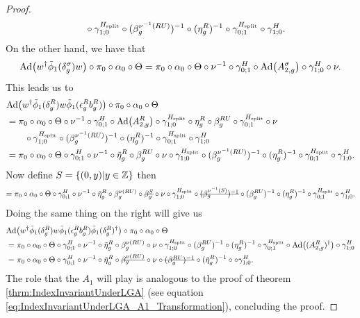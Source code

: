 \documentclass[11pt,a4paper,twoside]{article}
\numberwithin{equation}{section}
\begin{document}
\begin{proof}
\begin{align}
			\nonumber
			&\qquad \circ\gamma^{{H_{\text{split}}}}_{1;0}\circ(\beta_g^{\nu^{-1}(RU)})^{-1}\circ(\eta_g^R)^{-1}\circ\gamma^{{H_{\text{split}}}}_{0;1}\circ\gamma^{H}_{1;0}.
		\end{align}
		On the other hand, we have that
		\begin{equation}
			\Ad{w^\dagger \phiTilde_1(\delta_g^\sigma)w}\circ\pi_0\circ\alpha_0\circ\Theta=\pi_0\circ\alpha_0\circ\Theta\circ\nu^{-1}\circ\gamma^H_{0;1}\circ\Ad{A^\sigma_{2,g}}\circ\gamma^H_{1;0}\circ\nu.
		\end{equation}
		This leads us to
		\begin{align}
			&\Ad{w^\dagger\phiTilde_1(\delta_g^R)w\phiTilde_1(\epsilon_g^R b_g^R)}\circ\pi_0\circ\alpha_0\circ\Theta\\
			&=\pi_0\circ\alpha_0\circ\Theta\circ\nu^{-1}\circ\gamma^H_{0;1}\circ\Ad{A_{2,g}^R}\circ\gamma^{\Hsplit}_{1;0}\circ\eta_g^R\circ\beta_g^{RU}\circ\gamma^{\Hsplit}_{0;1}\circ\nu\\
			\nonumber
			&\qquad \circ\gamma^{\Hsplit}_{1;0}\circ(\beta_g^{\nu^{-1}(RU)})^{-1}\circ(\eta_g^R)^{-1}\circ\gamma^{\Hsplit}_{0;1}\circ\gamma^{H}_{1;0}\\
			&=\pi_0\circ\alpha_0\circ\Theta\circ\gamma^H_{0;1}\circ\nu^{-1}\circ\tilde\eta_g^R\circ\beta_g^{RU}\circ\nu\circ\gamma^{\Hsplit}_{1;0}\circ(\beta_g^{\nu^{-1}(RU)})^{-1}\circ(\eta_g^R)^{-1}\circ\gamma^{\Hsplit}_{0;1}\circ\gamma^{H}_{1;0}.
		\end{align}
		Now define $S=\{(0,y)|y\in\mathbb Z\}$ then
		\begin{equation}
			=\pi_0\circ\alpha_0\circ\Theta\circ\gamma^H_{0;1}\circ\nu^{-1}\circ\tilde\eta_g^R\circ\beta_g^{\nu(RU)}\circ\stkout{\beta_g^S}\circ\nu\circ\gamma^{\Hsplit}_{1;0}\circ\stkout{(\beta_g^{\nu^{-1}(S)})^{-1}}\circ(\beta_g^{RU})^{-1}\circ(\eta_g^R)^{-1}\circ\gamma^{\Hsplit}_{0;1}\circ\gamma^{H}_{1;0}.
		\end{equation}
		Doing the same thing on the right will give us
		\begin{align}
			&\Ad{w^\dagger\phiTilde_1(\delta_g^R)w\phiTilde_1(\epsilon_g^R b_g^R)\phiTilde_1(\delta_g^R)^\dagger}\circ\pi_0\circ\alpha_0\circ\Theta\\
			&=\pi_0\circ\alpha_0\circ\Theta\circ\gamma^H_{0;1}\circ\nu^{-1}\circ\tilde\eta_g^R\circ\beta_g^{\nu(RU)}\circ\nu\circ\gamma^{\Hsplit}_{1;0}\circ(\beta_g^{RU})^{-1}\circ(\eta_g^R)^{-1}\circ\gamma^{\Hsplit}_{0;1}\circ\Ad{(A_{2,g}^R)^\dagger}\circ\gamma^{H}_{1;0}\\
			&=\pi_0\circ\alpha_0\circ\Theta\circ\gamma^H_{0;1}\circ\nu^{-1}\circ\tilde\eta_g^R\circ\stkout{\beta_g^{\nu(RU)}}\circ\nu\circ\stkout{(\beta_g^{RU})^{-1}}\circ(\tilde\eta_g^R)^{-1}\circ\circ\gamma^{H}_{1;0}.
		\end{align}
		The role that the $A_1$ will play is analogous to the proof of theorem \ref{thrm:IndexInvariantUnderLGA} (see equation \eqref{eq:IndexInvariantUnderLGA_A1_Transformation}), concluding the proof.
	\end{proof}
\end{document}
